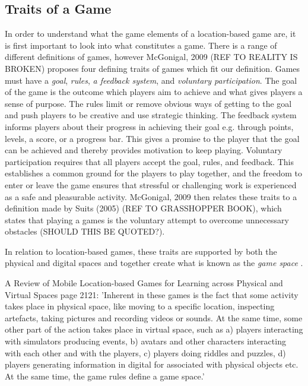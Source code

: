 \subsection{Traits of a Game}
In order to understand what the game elements of a location-based game are, it is first important to look into what constitutes a game. There is a range of different definitions of games, however McGonigal, 2009 (REF TO REALITY IS BROKEN) proposes four defining traits of games which fit our definition. Games must have a \textit{goal}, \textit{rules}, \textit{a feedback system}, and \textit{voluntary participation}. The goal of the game is the outcome which players aim to achieve and what gives players a sense of purpose. The rules limit or remove obvious ways of getting to the goal and push players to be creative and use strategic thinking. The feedback system informs players about their progress in achieving their goal e.g. through points, levels, a score, or a progress bar. This gives a promise to the player that the goal can be achieved and thereby provides motivation to keep playing. Voluntary participation requires that all players accept the goal, rules, and feedback. This establishes a common ground for the players to play together, and the freedom to enter or leave the game ensures that stressful or challenging work is experienced as a safe and pleasurable activity. McGonigal, 2009 then relates these traits to a definition made by Suits (2005) (REF TO GRASSHOPPER BOOK), which states that playing a games is the voluntary attempt to overcome unnecessary obstacles (SHOULD THIS BE QUOTED?). 

In relation to location-based games, these traits are supported by both the physical and digital spaces and together create what is known as the \textit{game space} \cite{LBG_Review}. 


A Review of Mobile Location-based Games for Learning across Physical and Virtual Spaces page 2121:
'Inherent in these games is the fact that some activity takes place in physical space, like moving to a specific location, inspecting artefacts, taking pictures and recording videos or sounds. At the same time, some other part of the action takes place in virtual space, such as a) players interacting with simulators producing events, b) avatars and other characters interacting with each other and with the players, c) players doing riddles and puzzles, d) players generating information in digital for associated with physical objects etc. At the same time, the game rules define a game space.'

